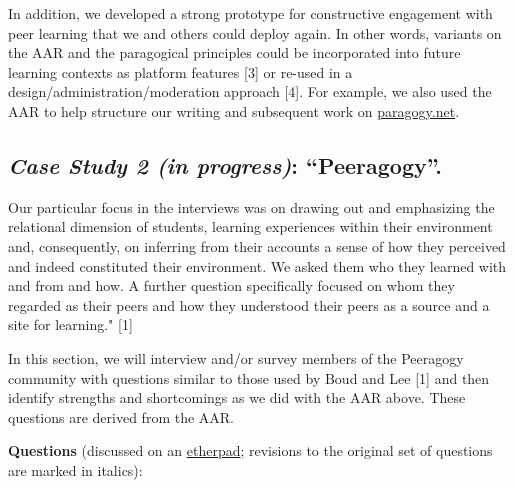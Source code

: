 In addition, we developed a strong prototype for constructive engagement
with peer learning that we and others could deploy again. In other
words, variants on the AAR and the paragogical principles could be
incorporated into future learning contexts as platform features {[}3{]}
or re-used in a design/administration/moderation approach {[}4{]}. For
example, we also used the AAR to help structure our writing and
subsequent work on \href{http://paragogy.net}{paragogy.net}.

\subsection{\emph{Case Study 2 (in progress)}: ``Peeragogy''.}

Our particular focus in the interviews was on drawing out and
emphasizing the relational dimension of students, learning experiences
within their environment and, consequently, on inferring from their
accounts a sense of how they perceived and indeed constituted their
environment. We asked them who they learned with and from and how. A
further question specifically focused on whom they regarded as their
peers and how they understood their peers as a source and a site for
learning." {[}1{]}

In this section, we will interview and/or survey members of the
Peeragogy community with questions similar to those used by Boud and Lee
{[}1{]} and then identify strengths and shortcomings as we did with the
AAR above. These questions are derived from the AAR.

\textbf{Questions} (discussed on an
\href{https://peeragogy.etherpad.mozilla.org/7}{etherpad}; revisions to
the original set of questions are marked in italics):

